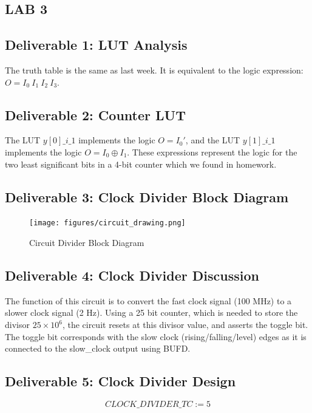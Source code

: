 \documentclass[10pt]{article}
\begin{document}

\begin{centering}
  \section*{LAB 3}
\end{centering}

\subsection*{Deliverable 1: LUT Analysis}

The truth table is the same as last week. It is equivalent to the logic expression: $ O=I_0~I_1~I_2~I_3 $.

\subsection*{Deliverable 2: Counter LUT}

The LUT $ y[0]\_i\_1 $ implements the logic $ O = I_0' $, and the LUT $ y[1]\_i\_1 $ implements the logic $ O = I_0 \oplus I_1 $. These expressions represent the logic for the two least significant bits in a 4-bit counter which we found in homework.

\subsection*{Deliverable 3: Clock Divider Block Diagram}

\begin{figure} [H]
  \center
  \texttt{[image: figures/circuit\_drawing.png]}
  \caption{Circuit Divider Block Diagram}
\end{figure}

\subsection*{Deliverable 4: Clock Divider Discussion}

The function of this circuit is to convert the fast clock signal (100 MHz) to a slower clock signal (2 Hz).
Using a 25 bit counter, which is needed to store the divisor $ 25 \times 10^{6} $, the circuit resets at this divisor value, and asserts the toggle bit.
The toggle bit corresponds with the slow clock (rising/falling/level) edges as it is connected to the slow\_clock output using BUFD.

\subsection*{Deliverable 5: Clock Divider Design}
\[
  CLOCK\_DIVIDER\_TC := 5
\]
\end{document}
